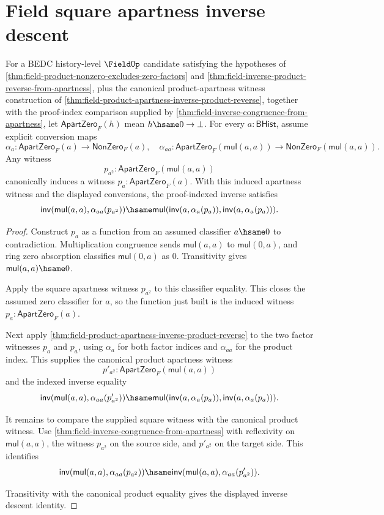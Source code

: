 \section{Field square apartness inverse descent}
\label{sec:field-square-apartness-inverse-descent}

\begin{theorem}
\label{thm:field-square-apartness-inverse-descent}
For a BEDC history-level $\FieldUp$ candidate satisfying the hypotheses of
\autoref{thm:field-product-nonzero-excludes-zero-factors} and
\autoref{thm:field-inverse-product-reverse-from-apartness}, plus the
canonical product-apartness witness construction of
\autoref{thm:field-product-apartness-inverse-product-reverse}, together with
the proof-index comparison supplied by
\autoref{thm:field-inverse-congruence-from-apartness}, let
$\mathsf{ApartZero}_F(h)$ mean $h\hsame0\to\bot$. For every
$a:\mathsf{BHist}$, assume explicit conversion maps
$$
\alpha_a:\mathsf{ApartZero}_F(a)\to\mathsf{NonZero}_F(a),
\quad
\alpha_{aa}:\mathsf{ApartZero}_F(\mathsf{mul}(a,a))\to
\mathsf{NonZero}_F(\mathsf{mul}(a,a)).
$$
Any witness
$$
p_{a^2}:\mathsf{ApartZero}_F(\mathsf{mul}(a,a))
$$
canonically induces a witness $p_a:\mathsf{ApartZero}_F(a)$. With this
induced apartness witness and the displayed conversions, the proof-indexed
inverse satisfies
$$
\mathsf{inv}(\mathsf{mul}(a,a),\alpha_{aa}(p_{a^2}))
\hsame
\mathsf{mul}(\mathsf{inv}(a,\alpha_a(p_a)),\mathsf{inv}(a,\alpha_a(p_a))).
$$
\end{theorem}
\begin{proof}
Construct $p_a$ as a function from an assumed classifier
$a\hsame0$ to contradiction. Multiplication congruence sends
$\mathsf{mul}(a,a)$ to $\mathsf{mul}(0,a)$, and ring zero absorption
classifies $\mathsf{mul}(0,a)$ as $0$. Transitivity gives
$\mathsf{mul}(a,a)\hsame0$.

Apply the square apartness witness $p_{a^2}$ to this classifier equality.
This closes the assumed zero classifier for $a$, so the function just built
is the induced witness $p_a:\mathsf{ApartZero}_F(a)$.

Next apply
\autoref{thm:field-product-apartness-inverse-product-reverse} to the two
factor witnesses $p_a$ and $p_a$, using $\alpha_a$ for both factor indices
and $\alpha_{aa}$ for the product index. This supplies the canonical product
apartness witness
$$
p'_{a^2}:\mathsf{ApartZero}_F(\mathsf{mul}(a,a))
$$
and the indexed inverse equality
$$
\mathsf{inv}(\mathsf{mul}(a,a),\alpha_{aa}(p'_{a^2}))
\hsame
\mathsf{mul}(\mathsf{inv}(a,\alpha_a(p_a)),\mathsf{inv}(a,\alpha_a(p_a))).
$$

It remains to compare the supplied square witness with the canonical product
witness. Use
\autoref{thm:field-inverse-congruence-from-apartness} with reflexivity on
$\mathsf{mul}(a,a)$, the witness $p_{a^2}$ on the source side, and
$p'_{a^2}$ on the target side. This identifies
$$
\mathsf{inv}(\mathsf{mul}(a,a),\alpha_{aa}(p_{a^2}))
\hsame
\mathsf{inv}(\mathsf{mul}(a,a),\alpha_{aa}(p'_{a^2})).
$$

Transitivity with the canonical product equality gives the displayed inverse
descent identity.
\end{proof}
